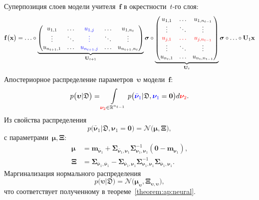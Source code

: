 Суперпозиция слоев модели учителя~$\mathbf{f}$ в окрестности~$t$-го слоя:
{\small
\[
\mathbf{f}\bigr(\mathbf{x}\bigr) = \ldots \circ
\underbrace{
\begin{pmatrix}
u_{1,1} & \ldots & {\color{blue} u_{1,j}} & \ldots & u_{1,n_{t}} \\
\vdots  & \ddots & {\color{blue} \vdots}  & \ddots & \vdots \\
u_{n_{t+1},1} & \ldots & {\color{blue} u_{n_{t+1},j}} & \ldots & u_{n_{t+1},n_{t}} \\
\end{pmatrix} 
}_{\mathbf{U}_{t+1}}
\bm{\sigma} 
\circ 
\underbrace{
\begin{pmatrix}
u_{1,1} & \ldots & u_{1,n_{t-1}} \\
\vdots  & \ddots & \vdots        \\
{\color{red} u_{j,1}} & {\color{red}\ldots} & {\color{red} u_{j,n_{t-1}}} \\
\vdots  & \ddots & \vdots        \\
u_{n_{t},1} & \ldots & u_{n_{t},n_{t-1}} \\
\end{pmatrix}
}_{\mathbf{U}_{t}}
\bm{\sigma}
\circ 
\ldots
\circ 
\mathbf{U}_1
\mathbf{x}
\]
}
Апостериорное распределение параметров~$\bm{\upsilon}$ модели~$\mathbf{f}$:
\[
p\bigr(\bm{\upsilon}|\mathfrak{D}\bigr)  = \int\limits_{{\color{red} \bm{\nu}_2} \in \mathbb{R}^{n_{t-1}}}p\bigr({\color{blue}\bar{\bm{\nu}}_1}|\mathfrak{D}, {\color{blue}\bm{\nu}_1}=\mathbf{0}\bigr) d{\color{red} \bm{\nu}_2}.
\]
Из свойства распределения 
\[
    p\bigr(\bar{\bm{\nu}}_1|\mathfrak{D}, \bm{\nu}_1=\mathbf{0}\bigr) = \mathcal{N}\bigr(\bm{\mu}, \bm{\Xi}\bigr),
\]
с параметрами~$\bm{\mu}, \bm{\Xi}$:
\[
\begin{aligned}
\bm{\mu} &= \mathbf{m}_{\bar{\bm{\nu}}_1}+\bm{\Sigma}_{\bar{\bm{\nu}}_1,\bm{\nu}_1} \bm{\Sigma}_{\bm{\nu}_1,\bm{\nu}_1}^{-1} \left(\mathbf{0} - \mathbf{m}_{\bm{\nu}_1}\right), \\
 \bm{\Xi} &= \bm{\Sigma}_{\bar{\bm{\nu}}_1,\bar{\bm{\nu}}_1} - \bm{\Sigma}_{\bar{\bm{\nu}}_1,\bm{\nu}_1} \bm{\Sigma}_{\bm{\nu}_1,\bm{\nu}_1}^{-1} \bm{\Sigma}_{\bar{\bm{\nu}}_1,\bm{\nu}_1}.
\end{aligned}
\]
Маргинализация нормального распределения
\[
p\bigr(\bm{\upsilon}|\mathfrak{D}\bigr) = \mathcal{N}\bigr(\bm{\mu}_{\bm{\upsilon}},  \bm{\Xi}_{\bm{\upsilon}, \bm{\upsilon}}\bigr),
\]
что соответствует полученному в теореме~\ref{theorem:ap:neural}.

